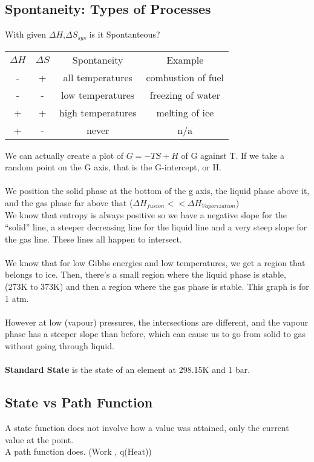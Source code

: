 \documentclass[10pt, twocolumn]{report}
\begin{document}
     \subsection{Spontaneity: Types of Processes}
     With given $\Delta H$,$\Delta S_{sys}$ is it Spontanteous?
     \begin{center}
         \begin{tabular}{c c c c}
             $\Delta H$ & $\Delta S$ & Spontaneity & Example \\
             - & + & all temperatures & combustion of fuel \\
             - & - & low temperatures & freezing of water \\
             + & +  & high temperatures & melting of ice \\
             + & - & never & n/a
         \end{tabular}
     \end{center}
     We can actually create a plot of $G = -TS + H$ of G against T. If we take a random point on the G axis, that is the G-intercept, or H.\\\\ We position the solid phase at the bottom of the g axis, the liquid phase above it, and the gas phase far above that ($\Delta H_{fusion} << \Delta H_{Vaporization}$)\\ We know that entropy is always positive so we have a negative slope for the ``solid'' line,  a steeper decreasing line for the liquid line and a very steep slope for the gas line. These lines all happen to intersect. \\\\ We know that for low Gibbs energies and low temperatures, we get a region that belongs to ice. Then, there's a small region where the liquid phase is stable, (273K to 373K) and then a region where the gas phase is stable. This graph is for 1 atm. \\\\ However at low (vapour) pressures, the intersections are different, and the vapour phase has a steeper slope than before, which can cause us to go from solid to gas without going through liquid.\\\\
     \textbf{Standard State} is the state of an element at 298.15K and 1 bar.
     \subsection{State vs Path Function}
     A state function does not involve how a value was attained, only the current value at the point. \\ A path function does. (Work , q(Heat))
\end{document}
